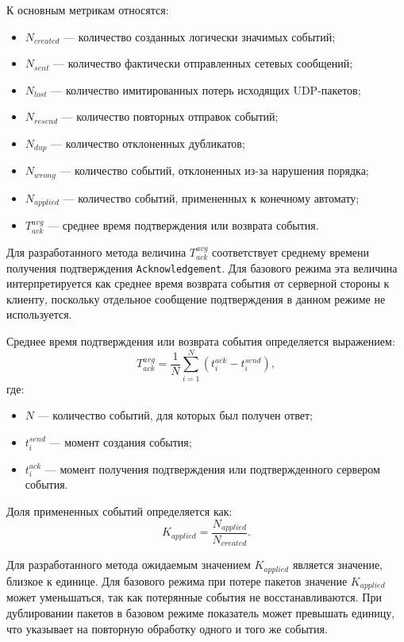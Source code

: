 К основным метрикам относятся:
\begin{itemize}
	\item $N_{created}$ --- количество созданных логически значимых событий;
	\item $N_{sent}$ --- количество фактически отправленных сетевых сообщений;
	\item $N_{lost}$ --- количество имитированных потерь исходящих UDP-пакетов;
	\item $N_{resend}$ --- количество повторных отправок событий;
	\item $N_{dup}$ --- количество отклоненных дубликатов;
	\item $N_{wrong}$ --- количество событий, отклоненных из-за нарушения порядка;
	\item $N_{applied}$ --- количество событий, примененных к конечному автомату;
	\item $T_{ack}^{avg}$ --- среднее время подтверждения или возврата события.
\end{itemize}

Для разработанного метода величина $T_{ack}^{avg}$ соответствует среднему времени получения подтверждения \texttt{Acknowledgement}. Для базового режима эта величина интерпретируется как среднее время возврата события от серверной стороны к клиенту, поскольку отдельное сообщение подтверждения в данном режиме не используется.

Среднее время подтверждения или возврата события определяется выражением:
\[
	T_{ack}^{avg} = \frac{1}{N}\sum_{i=1}^{N}(t_i^{ack} - t_i^{send}),
\]
где:
\begin{itemize}
	\item $N$ --- количество событий, для которых был получен ответ;
	\item $t_i^{send}$ --- момент создания события;
	\item $t_i^{ack}$ --- момент получения подтверждения или подтвержденного сервером события.
\end{itemize}

Доля примененных событий определяется как:
\[
	K_{applied} = \frac{N_{applied}}{N_{created}}.
\]

Для разработанного метода ожидаемым значением $K_{applied}$ является значение, близкое к единице. Для базового режима при потере пакетов значение $K_{applied}$ может уменьшаться, так как потерянные события не восстанавливаются. При дублировании пакетов в базовом режиме показатель может превышать единицу, что указывает на повторную обработку одного и того же события.

